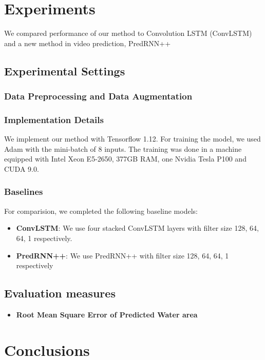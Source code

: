 \section{Experiments}
We compared performance of our method to Convolution LSTM (ConvLSTM) and a new method in video prediction, PredRNN++ %

\subsection{Experimental Settings}
\subsubsection{Data Preprocessing and Data Augmentation}

\subsubsection{Implementation Details}
We implement our method with Tensorflow 1.12. %
For training the model, we used Adam %
with the mini-batch of 8 inputs. The training was done in a machine equipped with Intel Xeon E5-2650, 377GB RAM, one Nvidia Tesla P100 and CUDA 9.0.

\subsubsection{Baselines}
For comparision, we completed the following baseline models:
\begin{itemize}
    \item \textbf{ConvLSTM}: We use four stacked ConvLSTM layers with filter size 128, 64, 64, 1 respectively. 
    \item \textbf{PredRNN++}: We use PredRNN++ with filter size 128, 64, 64, 1 respectively
\end{itemize}

\subsection{Evaluation measures}
\begin{itemize}
    \item \textbf{Root Mean Square Error of Predicted Water area}
\end{itemize}

\section{Conclusions}

